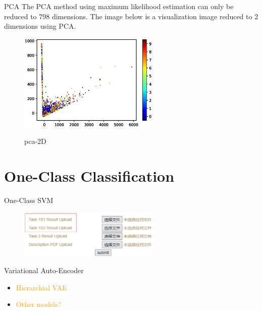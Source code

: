 \documentclass[
 size=14pt,
 paper=smartboard,  %
 mode=present, 		%
 display=slides, 	%
 style=tuliplab,  	%
 pauseslide,
 fleqn,leqno]{powerdot}
\begin{document}
\begin{slide}{PCA}
The PCA method using maximum likelihood estimation can only be reduced to 798 dimensions. The image below is a visualization image reduced to 2 dimensions using PCA.
\bigskip
\begin{figure}
	\centering
	\includegraphics[width=0.6\textwidth]{../.././Data/Figures/pca.eps}\\
	\caption{pca-2D}\label{fig:pca-2D}
\end{figure}

\end{slide}

\section{One-Class Classification}

\begin{slide}{One-Class SVM}
\begin{figure}
	\centering
	\includegraphics[width=0.6\textwidth]{../.././Data/Figures/tmp.eps}\\
	\label{fig:tmp}
\end{figure}
\end{slide}

\begin{slide}{Variational Auto-Encoder}
\begin{itemize}
	\item \textcolor{orange}{Hierarchial VAE}
	\item \textcolor{orange}{Other models?}
\end{itemize}
\end{slide}
\end{document}
